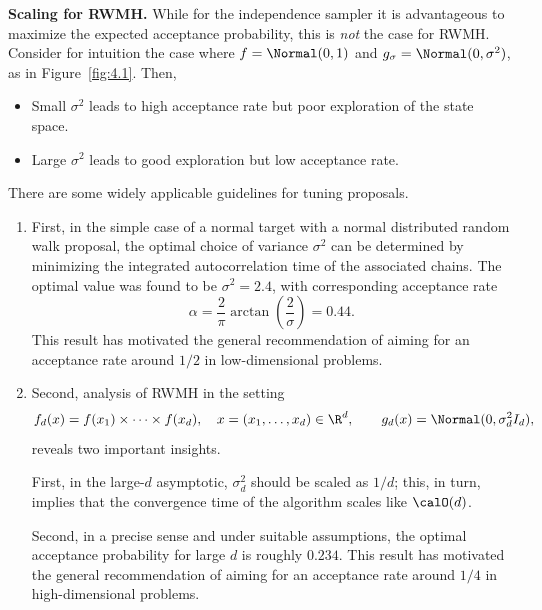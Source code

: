 \medskip
\noindent\textbf{Scaling for RWMH.}
While for the independence sampler it is advantageous to maximize the
expected acceptance probability, this is \textit{not} the case for RWMH. Consider for intuition the case
where $f = \Normal(0,1)$ and $g_\sigma = \Normal(0, \sigma^2)$, as in Figure~\ref{fig:4.1}. Then,
\begin{itemize}
  \item Small $\sigma^2$ leads to high acceptance rate but poor exploration of the state space.
  \item Large $\sigma^2$ leads to good exploration but low acceptance rate.
\end{itemize}
There are some widely applicable guidelines for tuning proposals.
\begin{enumerate}
\item First, in the simple case of a normal target with a normal distributed random walk proposal,
the optimal choice of variance $\sigma^2$ can be determined by minimizing the integrated
autocorrelation time of the associated chains. The optimal value was found to be $\sigma^2 = 2.4$,
with corresponding acceptance rate
\[
  \alpha = \frac{2}{\pi}\arctan\!\left(\frac{2}{\sigma}\right) = 0.44.
\]
This result has motivated the general recommendation of aiming for an acceptance rate
around $1/2$ in low-dimensional problems.

\item Second, analysis of RWMH in the setting
\[
  f_d(x) = f(x_1) \times \cdots \times f(x_d), \quad x = (x_1, \ldots, x_d) \in \R^d,
  \qquad g_d(x) = \Normal(0, \sigma_d^2 I_d),
\]
reveals two important insights.

First, in the large-$d$ asymptotic, $\sigma_d^2$ should be scaled as $1/d$; this, in turn, implies that the
convergence time of the algorithm scales like $\calO(d)$.

Second, in a precise sense and under suitable assumptions, the optimal acceptance probability for large $d$ is roughly $0.234$. This result has motivated the general recommendation
of aiming for an acceptance rate around $1/4$ in high-dimensional problems.
\end{enumerate}
